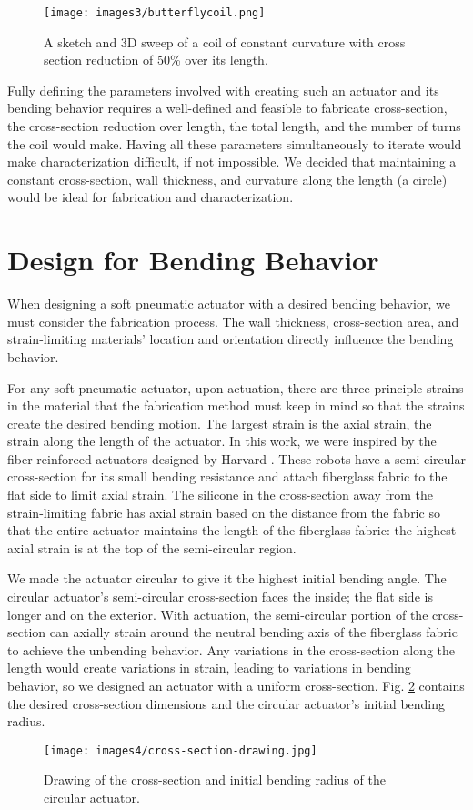 \begin{figure}[ht]
    \centering
    \texttt{[image: images3/butterflycoil.png]}
    \caption{A sketch and 3D sweep of a coil of constant curvature with cross section reduction of 50\% over its length.}
    \label{fig:butterflycoil}
\end{figure}

Fully defining the parameters involved with creating such an actuator and its bending behavior requires a well-defined and feasible to fabricate cross-section, the cross-section reduction over length, the total length, and the number of turns the coil would make. Having all these parameters simultaneously to iterate would make characterization difficult, if not impossible. We decided that maintaining a constant cross-section, wall thickness, and curvature along the length (a circle) would be ideal for fabrication and characterization. 

\section{Design for Bending Behavior}

When designing a soft pneumatic actuator with a desired bending behavior, we must consider the fabrication process. The wall thickness, cross-section area, and strain-limiting materials' location and orientation directly influence the bending behavior. 

For any soft pneumatic actuator, upon actuation, there are three principle strains in the material that the fabrication method must keep in mind so that the strains create the desired bending motion. The largest strain is the axial strain, the strain along the length of the actuator. In this work, we were inspired by the fiber-reinforced actuators designed by Harvard \cite{galloway_mechanically_2013}. These robots have a semi-circular cross-section for its small bending resistance \cite{polygerinos_modeling_2015} and attach fiberglass fabric to the flat side to limit axial strain. The silicone in the cross-section away from the strain-limiting fabric has axial strain based on the distance from the fabric so that the entire actuator maintains the length of the fiberglass fabric: the highest axial strain is at the top of the semi-circular region.  

We made the actuator circular to give it the highest initial bending angle. The circular actuator's semi-circular cross-section faces the inside; the flat side is longer and on the exterior. With actuation, the semi-circular portion of the cross-section can axially strain around the neutral bending axis of the fiberglass fabric to achieve the unbending behavior. Any variations in the cross-section along the length would create variations in strain, leading to variations in bending behavior, so we designed an actuator with a uniform cross-section. Fig. \ref{fig:crosssection} contains the desired cross-section dimensions and the circular actuator's initial bending radius.

\begin{figure}[ht]
    \centering
    \texttt{[image: images4/cross-section-drawing.jpg]}
    \caption{Drawing of the cross-section and initial bending radius of the circular actuator.}
    \label{fig:crosssection}
\end{figure}